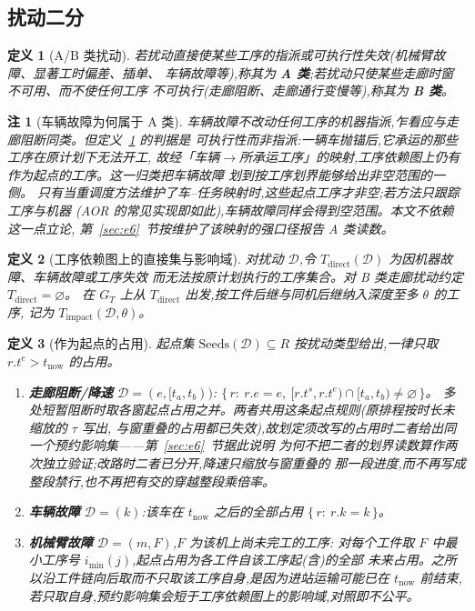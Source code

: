 \documentclass[manuscript,screen,review]{acmart}
\newtheorem{definition}{定义}
\newtheorem{remark}{注}
\begin{document}
\subsection{扰动二分}
\label{sec:disturbance_classes}

\begin{definition}[A/B 类扰动]
\label{def:ab}
若扰动直接使某些工序的指派或\emph{可执行性}失效(机械臂故障、显著工时偏差、插单、
车辆故障等),称其为 \textbf{A 类};若扰动只使某些走廊时窗不可用、而不使任何工序
不可执行(走廊阻断、走廊通行变慢等),称其为 \textbf{B 类}。
\end{definition}

\begin{remark}[车辆故障为何属于 A 类]
\label{rem:agv_class}
车辆故障不改动任何工序的机器指派,乍看应与走廊阻断同类。但定义~\ref{def:ab} 的判据是
\emph{可执行性}而非指派:一辆车抛锚后,它承运的那些工序在原计划下无法开工,
故经「车辆\(\to\)所承运工序」的映射,工序依赖图上仍有作为起点的工序。这一归类把车辆故障
划到按工序划界能够给出非空范围的一侧。
只有当重调度方法维护了车--任务映射时,这些起点工序才非空;若方法只跟踪工序与机器
(AOR 的常见实现即如此),车辆故障同样会得到空范围。本文不依赖这一点立论,
第~\ref{sec:e6}~节按维护了该映射的强口径报告 A 类读数。
\end{remark}

\begin{definition}[工序依赖图上的直接集与影响域]
\label{def:task_impact}
对扰动 \(\mathcal{D}\),令 \(T_{\mathrm{direct}}(\mathcal{D})\) 为因机器故障、车辆故障或工序失效
而无法按原计划执行的工序集合。对 B 类走廊扰动约定 \(T_{\mathrm{direct}}=\varnothing\)。
在 \(G_T\) 上从 \(T_{\mathrm{direct}}\) 出发,按工件后继与同机后继纳入深度至多 \(\theta\) 的工序,
记为 \(T_{\mathrm{impact}}(\mathcal{D},\theta)\)。
\end{definition}

\begin{definition}[作为起点的占用]
\label{def:seeds}
起点集 \(\mathrm{Seeds}(\mathcal{D})\subseteq R\) 按扰动类型给出,一律只取
\(r.t^e>t_{\mathrm{now}}\) 的占用。
\begin{enumerate}[label=(\alph*),leftmargin=1.6em,itemsep=0.15em]
\item \textbf{走廊阻断/降速} \(\mathcal{D}=(e,[t_a,t_b))\):
\(\{\,r:\ r.e=e,\ [r.t^s,r.t^e)\cap[t_a,t_b)\neq\varnothing\,\}\)。
多处短暂阻断时取各窗起点占用之并。两者共用这条起点规则(原排程按时长未缩放的 \(\tau\) 写出,
与窗重叠的占用都已失效),故划定须改写的占用时二者给出同一个预约影响集——第~\ref{sec:e6}~节据此说明
为何不把二者的划界读数算作两次独立验证;改路时二者已分开,降速只缩放与窗重叠的
那一段进度,而不再写成整段禁行,也不再把有交的穿越整段乘倍率。
\item \textbf{车辆故障} \(\mathcal{D}=(k)\):该车在 \(t_{\mathrm{now}}\) 之后的全部占用
\(\{\,r:\ r.k=k\,\}\)。
\item \textbf{机械臂故障} \(\mathcal{D}=(m,F)\),\(F\) 为该机上尚未完工的工序:
对每个工件取 \(F\) 中最小工序号 \(i_{\min}(j)\),起点占用为各工件自该工序起(含)的全部
未来占用。之所以沿工件链向后取而不只取该工序自身,是因为进站运输可能已在
\(t_{\mathrm{now}}\) 前结束,若只取自身,预约影响集会短于工序依赖图上的影响域,对照即不公平。
\end{enumerate}
\end{definition}
\end{document}
